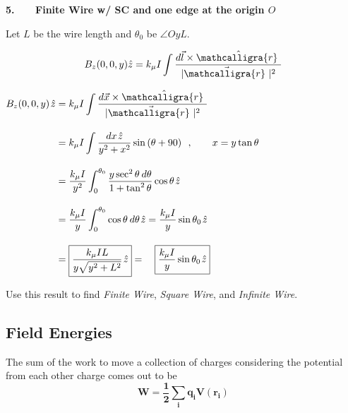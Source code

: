 \documentclass[12pt]{article}
\newcommand{\scripty}[1]{\ensuremath{\mathcalligra{#1}}}
\newcommand*{\cursrr}{\scripty{r}\ }
\newcommand{\hs}{\hspace{1pt}}
\begin{document}
\begin{minipage}[t]{.48\textwidth}
	\textbf{5. \ \ \ Finite Wire w/ SC and one edge at the origin \(O\)}
	
	\vspace{10pt}	
	Let \(L\) be the wire length and \(\theta_0\) be \(\angle OyL\).

	\vspace{5pt}
	\[ \displaystyle B_z(0,0,y) \hat{z} = k_\mu I \int \frac{ d\vec{l} \times \hat{\cursrr} }{| \vec{\cursrr} |^2}\]

	\vspace{10pt}
	\(\begin{aligned}
		B_z(0,0,y) \hs \hat{z}
			& = k_\mu I \int \frac{ d\vec{x} \times \hat{\cursrr} }{| \vec{\cursrr} |^2}
				\\[10pt]
			& = k_\mu I \int \frac{dx \hs \hat{z} }{y^2 + x^2} \sin{(\theta+90)}
				\ \ , \hspace{20pt} x = y \tan{\theta}
				\\[10pt]
			& = \frac{k_\mu I}{y^2} \int_0^{\theta_0} 
				\frac{y \sec^2{\theta} \hs\hs d\theta}{1 + \tan^2{\theta}} \cos{\theta} \hs \hat{z} 
				\\[10pt]
			& = \frac{k_\mu I}{y} \int_0^{\theta_0} \cos{\theta} \hs\hs d\theta \hs \hat{z} 
				= \frac{k_\mu I}{y} \sin{\theta_0} \hs \hat{z} 
				\\[10pt]
			& = \boxed{ \frac{k_\mu I L}{y \sqrt{y^2+L^2}} \hs \hat{z} } 
				= \quad \boxed{ \frac{k_\mu I}{y} \sin{\theta_0} \hs \hat{z} }
	\end{aligned}\)

	\vspace{30pt}
	Use this result to find \textit{Finite Wire}, \textit{Square Wire}, and \textit{Infinite Wire}.
\end{minipage}

%
%
\newpage
\subsection{Field Energies}
The sum of the work to move a collection of charges considering 
the potential from each other charge comes out to be
\[ \boldsymbol{ W = \frac{1}{2} \sum_i q_i V(r_i) } \]
\end{document}
